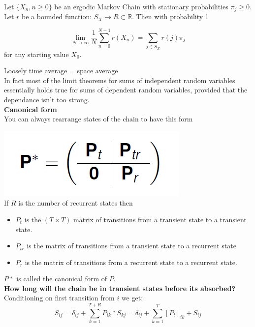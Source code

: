 Let $\{X_n, n \geq 0 \}$ be an ergodic Markov Chain with stationary probabilities $\pi_j \geq 0$. Let $r$ be a bounded function: $S_X \rightarrow R \subset \mathbb{R}$. Then with probability 1

$$ \lim_{N \rightarrow \infty} \frac{1}{N} \sum_{n=0}^{N-1} r(X_n) = \sum_{j \in S_X} r(j) \pi_j $$
for any starting value $X_0$.

Loosely time average = space average\\

In fact most of the limit theorems for sums of independent random variables essentially holds true for sums of dependent random variables, provided that the dependance isn't too strong.\\

\textbf{Canonical form}\\
You can always rearrange states of the chain to have this form

\includegraphics[scale = 0.3]{canonical}\\

If $R$ is the number of recurrent states then\\
\begin{itemize}
	\item $P_t$ is the $(T \times T)$ matrix of transitions from a transient state to a transient state.\\
	\item $P_{tr}$ is the matrix of transitions from a transient state to a recurrent state
	\item $P_r$ is the matrix of transitions from a recurrent state to a recurrent state.
\end{itemize}

$P*$ is called the canonical form of $P$.\\

\textbf{How long will the chain be in transient states before its absorbed?}\\

Conditioning on first transition from $i$ we get:
$$S_{ij} = \delta_{ij} + \sum_{k=1}^{T+R} P_{ik}* S_{kj} = \delta_{ij} + \sum_{k=1}^T [P_t]_{ik} +S_{ij}$$

